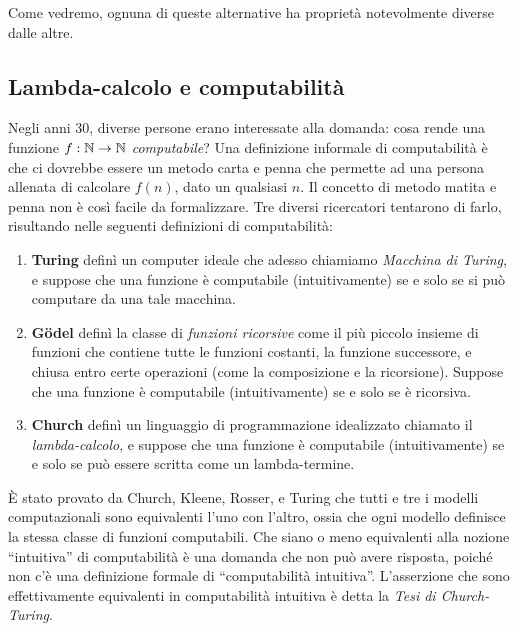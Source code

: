 \documentclass{article}
\begin{document}
Come vedremo, ognuna di queste alternative ha propriet\`a notevolmente
diverse dalle altre.

\subsection{Lambda-calcolo e computabilit\`a}

Negli anni 30, diverse persone erano interessate alla domanda: cosa
rende una funzione $f:\mathbb{N}\to\mathbb{N}$ {\em computabile}? Una
definizione informale di computabilit\`a \`e che ci dovrebbe essere un metodo 
carta e penna che permette ad una persona allenata di calcolare $f(n)$,
dato un qualsiasi $n$. Il concetto di metodo matita e penna non \`e
cos\`i facile da formalizzare. Tre diversi ricercatori tentarono di farlo,
risultando nelle seguenti definizioni di computabilit\`a:

\begin{enumerate}
\item {\bf Turing} defin\`i un computer ideale che adesso chiamiamo 
{\em Macchina di Turing}, e suppose che una funzione \`e computabile 
(intuitivamente) se e solo se si pu\`o computare da una tale macchina.
\item {\bf G\"odel} defin\`i la classe di {\em funzioni ricorsive} come il 
pi\`u piccolo insieme di funzioni che contiene tutte le funzioni costanti, 
la funzione successore, e chiusa entro certe operazioni (come la 
composizione e la ricorsione). Suppose che una funzione \`e computabile 
(intuitivamente) se e solo se \`e ricorsiva.
\item {\bf Church} defin\`i un linguaggio di programmazione idealizzato 
chiamato il {\em lambda-calcolo}, e suppose che una funzione
\`e computabile (intuitivamente) se e solo se pu\`o
essere scritta come un lambda-termine.
\end{enumerate}

\`E stato provato da Church, Kleene, Rosser, e Turing che tutti e
tre i modelli computazionali sono equivalenti l'uno con l'altro, ossia che
ogni modello definisce la stessa classe di funzioni computabili. Che siano o meno
equivalenti alla nozione ``intuitiva'' di computabilit\`a \`e
una domanda che non pu\`o avere risposta, poich\'e non c'\`e una definizione
formale di ``computabilit\`a intuitiva''. L'asserzione che sono
effettivamente equivalenti in computabilit\`a intuitiva \`e detta la
{\em Tesi di Church-Turing}.

\end{document}
